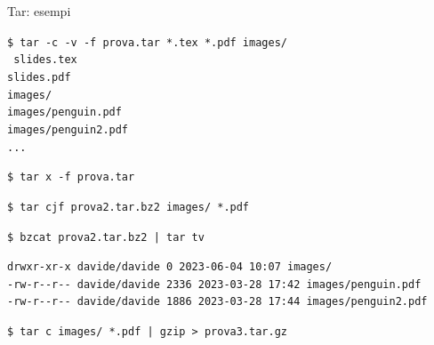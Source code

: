 \documentclass{beamer}
\begin{document}
    \begin{frame}{Tar: esempi}
        \scriptsize
        \begin{exampleblock}{}
            \texttt{\$ tar -c -v -f prova.tar *.tex *.pdf images/} \\
            \texttt{
            slides.tex \\
                slides.pdf \\
                images/ \\
                images/penguin.pdf \\
                images/penguin2.pdf \\
                ...
            }

            \vspace{0.25cm}

            \texttt{\$ tar x -f prova.tar}

            \texttt{\$ tar cjf prova2.tar.bz2 images/ *.pdf}
            
            \vspace{0.25cm}

            \texttt{\$ bzcat prova2.tar.bz2 | tar tv}

            \texttt{drwxr-xr-x davide/davide     0 2023-06-04 10:07 images/ \\
            -rw-r-{}-r-{}- davide/davide  2336 2023-03-28 17:42 images/penguin.pdf \\
            -rw-r-{}-r-{}- davide/davide  1886 2023-03-28 17:44 images/penguin2.pdf
            }

            \vspace{0.25cm}

            \texttt{\$ tar c images/ *.pdf | gzip > prova3.tar.gz}
        \end{exampleblock}
    \end{frame}
\end{document}
